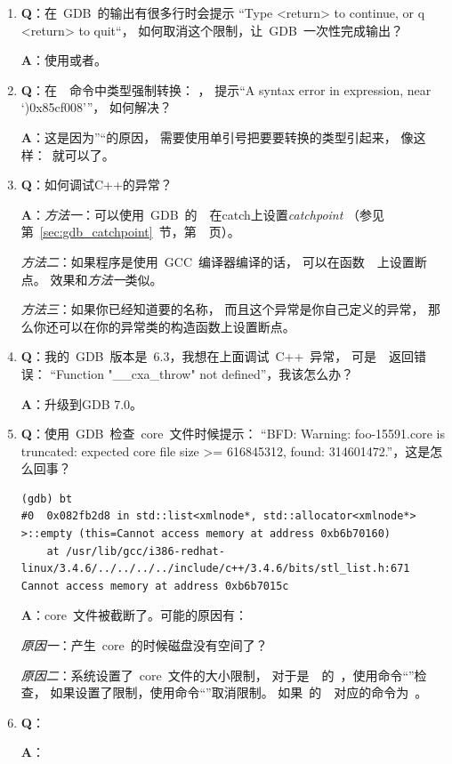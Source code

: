 \begin{enumerate}
\item \textbf{Q}：在~GDB~的输出有很多行时会提示
“Type <return> to continue, or q <return> to quit“，
如何取消这个限制，让~GDB~一次性完成输出？

\textbf{A}：使用或者。

\item \textbf{Q}：在~~命令中类型强制转换：
，
提示“A syntax error in expression, near `)0x85cf008'”，
如何解决？

\textbf{A}：这是因为”\code{::}“的原因，
需要使用单引号把要要转换的类型引起来，
像这样：~就可以了。

\item \textbf{Q}：如何调试C++的异常？

\textbf{A}：\emph{方法一}：可以使用~GDB~的~~在catch上设置\emph{catchpoint}
（参见第~\ref{sec:gdb_catchpoint}~节，第~\pageref{sec:gdb_catchpoint}~页）。

\emph{方法二}：如果程序是使用~GCC~编译器编译的话，
可以在函数~~上设置断点。
效果和\emph{方法一}类似。

\emph{方法三}：如果你已经知道要的名称，
而且这个异常是你自己定义的异常，
那么你还可以在你的异常类的构造函数上设置断点。

\item \textbf{Q}：我的~GDB~版本是~6.3，我想在上面调试~C++~异常，
可是~~返回错误：
“Function "\_\_cxa\_throw" not defined”，我该怎么办？

\textbf{A}：升级到GDB 7.0。

\item \textbf{Q}：使用~GDB~检查~core~文件时候提示：
“BFD: Warning: foo-15591.core is truncated: expected core file size >= 616845312, found: 314601472.”，这是怎么回事？
\begin{lstlisting}
(gdb) bt
#0  0x082fb2d8 in std::list<xmlnode*, std::allocator<xmlnode*> >::empty (this=Cannot access memory at address 0xb6b70160)
    at /usr/lib/gcc/i386-redhat-linux/3.4.6/../../../../include/c++/3.4.6/bits/stl_list.h:671
Cannot access memory at address 0xb6b7015c
\end{lstlisting}

\textbf{A}：core~文件被截断了。可能的原因有：

\emph{原因一}：产生~core~的时候磁盘没有空间了？

\emph{原因二}：系统设置了~core~文件的大小限制，
对于是~~的~，使用命令“”检查，
如果设置了限制，使用命令“”取消限制。
如果~的~~对应的命令为~。


\item \textbf{Q}：

\textbf{A}：

\end{enumerate}



